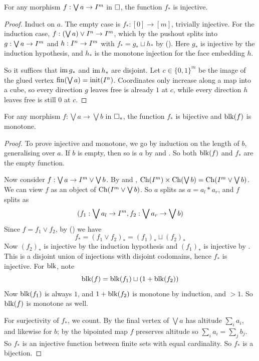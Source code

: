 \documentclass[11pt]{article}
\begin{document}
\begin{lemma}\label{lem:coord-injective}
  For any morphism $f : \bigvee a \to I^{m}$ in $\square$, the function $f_*$ is injective.
\end{lemma}
\begin{proof}
  Induct on $a$. The empty case is $f_* : [0] \to [m]$, trivially injective. 
  For the induction case, $f : (\bigvee a) \vee I^{n} \to I^{m}$, which by the pushout splits into
  $g : \bigvee a \to I^{m}$ and $h : I^{n} \to I^{m}$ with $f_* = g_* \sqcup h_*$ by (). 
  Here $g_*$ is injective by the induction hypothesis, and $h_*$ is the monotone injection for the face embedding $h$.

  So it suffices that $\operatorname{im} g_*$ and $\operatorname{im} h_*$ are disjoint. Let $c \in \{0,1\}^m$ be the image of
  the glued vertex $\operatorname{fin}(\bigvee a) = \operatorname{init}(I^{n})$. Coordinates only increase along a map into
  a cube, so every direction $g$ leaves free is already $1$ at $c$, while every direction $h$
  leaves free is still $0$ at $c$.
\end{proof}

\begin{lemma}\label{lem:coord-bijective}
  For any morphism $f : \bigvee a \to \bigvee b$ in $\square_{*}$, the function $f_*$ is bijective and $\operatorname{blk}(f)$ is monotone.
\end{lemma}
\begin{proof}
  To prove injective and monotone, we go by induction on the length of $b$, generalising over $a$.
  If $b$ is empty, then so is $a$ by  and . 
  So both $\operatorname{blk}(f)$ and $f_*$ are the empty function.

  Now consider $f : \bigvee a \to I^{m} \vee \bigvee b$. 
  By  and , 
  $\operatorname{Ch}(I^{m}) \times \operatorname{Ch}(\bigvee b) = \operatorname{Ch}(I^{m} \vee \bigvee b)$. 
  We can view $f$ as an object of $\operatorname{Ch}(I^{m} \vee \bigvee b)$. 
  So $a$ splits as $a = a_l \ast a_r$, and $f$ splits as
  \[
  (f_1 : \bigvee a_l \to I^{m}, f_2 : \bigvee a_r \to \bigvee b)
  \]
  Since $f = f_1 \vee f_2$, by () we have
  \[
    f_* = (f_1 \vee f_2)_* = (f_1)_* \sqcup (f_2)_* 
  \]
  Now $(f_2)_*$ is injective by the induction hypothesis and $(f_1)_*$ is injective by .
  This is a disjoint union of injections with disjoint codomains, hence $f_*$ is injective.
  For $\operatorname{blk}$, note
  \[ 
  \operatorname{blk}(f) = \operatorname{blk}(f_1) \sqcup (1 + \operatorname{blk}(f_2))
  \]
  Now $\operatorname{blk}(f_1)$ is always $1$, and $1+\operatorname{blk}(f_2)$ is monotone by induction, and $>1$.
  So $\operatorname{blk}(f)$ is monotone as well.

  For surjectivity of $f_*$, we count. By  the final vertex of $\bigvee a$ has altitude
  $\sum_i a_i$, and likewise for $b$; by  the bipointed map $f$ preserves
  altitude so $\sum_i a_i = \sum_j b_j$. So $f_*$ is an injective function between finite sets with 
  equal cardinality. So $f_*$ is a bijection.
\end{proof}
\end{document}
